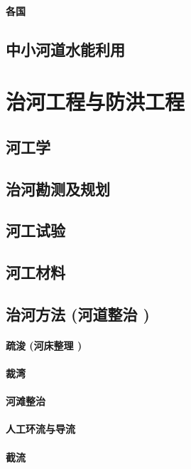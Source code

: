 \documentclass[UTF8]{../../ApplicationUniverse}
\begin{document}
    \subsubsection{各国}
\section{中小河道水能利用}













\chapter{治河工程与防洪工程}
\section{河工学}
\section{治河勘测及规划}
\section{河工试验}
\section{河工材料}
\section{治河方法 (河道整治 )}
    \subsubsection{疏浚 (河床整理 )}
    \subsubsection{裁湾}
    \subsubsection{河滩整治}
    \subsubsection{人工环流与导流}
    \subsubsection{截流}
\end{document}
